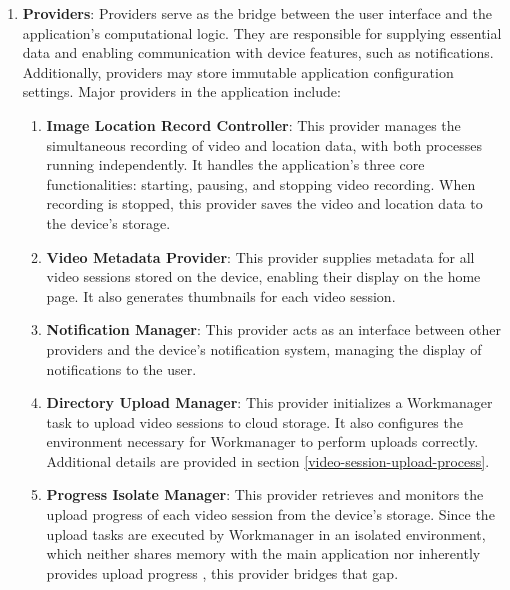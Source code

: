 \begin{enumerate}
    \item \textbf{Providers}: Providers serve as the bridge between the user interface and the application's computational logic. They are responsible for supplying essential data and enabling communication with device features, such as notifications. Additionally, providers may store immutable application configuration settings. Major providers in the application include:
    \begin{enumerate}
        \item \textbf{Image Location Record Controller}: This provider manages the simultaneous recording of video and location data, with both processes running independently. It handles the application's three core functionalities: starting, pausing, and stopping video recording. When recording is stopped, this provider saves the video and location data to the device's storage.
        \item \textbf{Video Metadata Provider}: This provider supplies metadata for all video sessions stored on the device, enabling their display on the home page. It also generates thumbnails for each video session.  
        \item \textbf{Notification Manager}: This provider acts as an interface between other providers and the device's notification system, managing the display of notifications to the user.  
        \item \textbf{Directory Upload Manager}: This provider initializes a Workmanager task to upload video sessions to cloud storage. It also configures the environment necessary for Workmanager to perform uploads correctly. Additional details are provided in section \ref{video-session-upload-process}.  
        \item \textbf{Progress Isolate Manager}: This provider retrieves and monitors the upload progress of each video session from the device's storage. Since the upload tasks are executed by Workmanager in an isolated environment, which neither shares memory with the main application nor inherently provides upload progress \cite{workmanager-doc}, this provider bridges that gap.
    \end{enumerate}
    

\end{enumerate}
